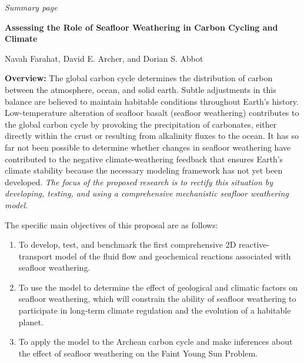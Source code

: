\documentclass[authoryear,round,12pt]{article}
\begin{document}



\sloppy
\begin{center}
 \textit{Summary page}

 \bigskip
 
 \textbf{\Large Assessing the Role of Seafloor Weathering in Carbon Cycling and Climate}

 \bigskip
Navah Farahat, David E. Archer, and Dorian S. Abbot
\end{center}


\textbf{Overview:} The global carbon cycle 
determines the distribution of carbon between the atmosphere, ocean,
and solid earth. Subtle adjustments in this balance are believed to
maintain habitable conditions
throughout Earth's history. Low-temperature alteration of seafloor
basalt (seafloor weathering) contributes to the global carbon cycle by
provoking the precipitation of carbonates, either directly within the crust or resulting from alkalinity fluxes to the ocean.  
It has so far not
been possible to determine whether changes in seafloor weathering have
contributed to the negative climate-weathering feedback that ensures
Earth's climate stability because the necessary modeling framework has
not yet been developed. \textit{The focus of the proposed research is
  to rectify this situation by developing, testing, and using a
  comprehensive mechanistic seafloor weathering model.}


The specific main objectives of this proposal are as follows:
\begin{enumerate}
\item To develop, test, and benchmark the first comprehensive 2D
  reactive-transport model of the fluid flow and geochemical reactions
  associated with seafloor weathering.
\item To use the model to determine the effect of geological and
  climatic factors on seafloor weathering, which will constrain the
  ability of seafloor weathering to participate in long-term climate
  regulation and the evolution of a habitable planet.
\item To apply the model to the Archean carbon cycle and make
  inferences about the effect of seafloor weathering on the Faint
  Young Sun Problem.
\end{enumerate}
\end{document}
